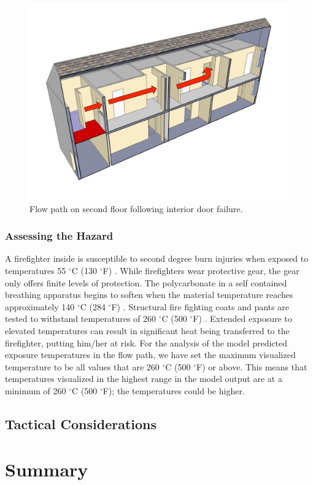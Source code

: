 \documentclass[11pt,oneside]{book}
\begin{document}
\begin{figure}[h!]
\centering
\includegraphics[width=.7\textwidth]{../Figures/ChicagoFlow}
\caption{Flow path on second floor following interior door failure.}
\label{fig:flowpath_1}
\end{figure}

\subsection{Assessing the Hazard}

A firefighter inside is susceptible to second degree burn injuries when exposed to temperatures 55 $^{\circ}$C (130 $^{\circ}$F) \cite{designation2003c}. While firefighters wear protective gear, the gear only offers finite levels of protection. The polycarbonate in a self contained breathing apparatus begins to soften when the material temperature reaches approximately 140 $^{\circ}$C (284 $^{\circ}$F) \cite{mensch2011emergency}. Structural fire fighting coats and pants are tested to withstand temperatures of 260 $^{\circ}$C (500 $^{\circ}$F) \cite{nfpa2013standard}. Extended exposure to elevated temperatures can result in significant heat being transferred to the firefighter, putting him/her at risk. For the analysis of the model predicted exposure temperatures in the flow path, we have set the maximum visualized temperature to be all values that are 260 $^{\circ}$C (500 $^{\circ}$F) or above. This means that temperatures visualized in the highest range in the model output are at a minimum of 260 $^{\circ}$C (500 $^{\circ}$F); the temperatures could be higher.

\section{Tactical Considerations}

\chapter{Summary}
\end{document}
